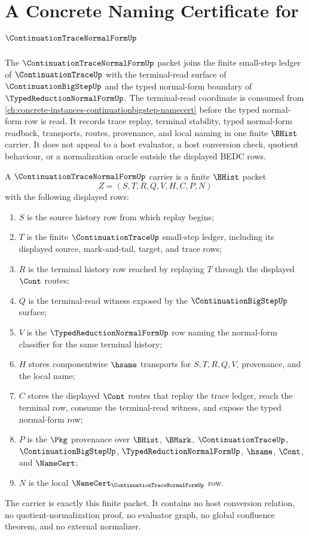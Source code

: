 \chapter{A Concrete Naming Certificate for $\ContinuationTraceNormalFormUp$}
\label{ch:concrete-instances-continuationtracenormalform-namecert}

The $\ContinuationTraceNormalFormUp$ packet joins the finite small-step ledger of $\ContinuationTraceUp$ with the terminal-read surface of $\ContinuationBigStepUp$ and the typed normal-form boundary of $\TypedReductionNormalFormUp$. The terminal-read coordinate is consumed from \autoref{ch:concrete-instances-continuationbigstep-namecert} before the typed normal-form row is read. It records trace replay, terminal stability, typed normal-form readback, transports, routes, provenance, and local naming in one finite $\BHist$ carrier. It does not appeal to a host evaluator, a host conversion check, quotient behaviour, or a normalization oracle outside the displayed BEDC rows.

\begin{definition}
\label{def:continuation-trace-normal-form-carrier}
A $\ContinuationTraceNormalFormUp$ carrier is a finite $\BHist$ packet
$$
Z=(S,T,R,Q,V,H,C,P,N)
$$
with the following displayed rows:
\begin{enumerate}
\item $S$ is the source history row from which replay begins;
\item $T$ is the finite $\ContinuationTraceUp$ small-step ledger, including its displayed source, mark-and-tail, target, and trace rows;
\item $R$ is the terminal history row reached by replaying $T$ through the displayed $\Cont$ routes;
\item $Q$ is the terminal-read witness exposed by the $\ContinuationBigStepUp$ surface;
\item $V$ is the $\TypedReductionNormalFormUp$ row naming the normal-form classifier for the same terminal history;
\item $H$ stores componentwise $\hsame$ transports for $S,T,R,Q,V$, provenance, and the local name;
\item $C$ stores the displayed $\Cont$ routes that replay the trace ledger, reach the terminal row, consume the terminal-read witness, and expose the typed normal-form row;
\item $P$ is the $\Pkg$ provenance over $\BHist$, $\BMark$, $\ContinuationTraceUp$, $\ContinuationBigStepUp$, $\TypedReductionNormalFormUp$, $\hsame$, $\Cont$, and $\NameCert$;
\item $N$ is the local $\NameCert_{\ContinuationTraceNormalFormUp}$ row.
\end{enumerate}
The carrier is exactly this finite packet. It contains no host conversion relation, no quotient-normalization proof, no evaluator graph, no global confluence theorem, and no external normalizer.
\end{definition}

